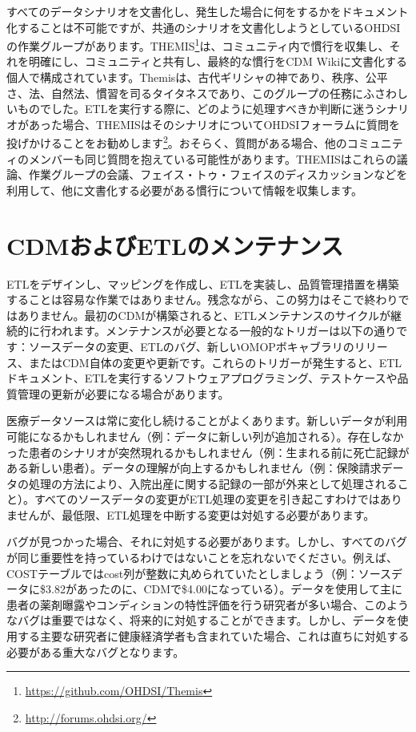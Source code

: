 \documentclass[
  11pt]{book}
\theoremstyle{definition}
\theoremstyle{definition}
\theoremstyle{definition}
\theoremstyle{definition}
\theoremstyle{remark}
\begin{document}
すべてのデータシナリオを文書化し、発生した場合に何をするかをドキュメント化することは不可能ですが、共通のシナリオを文書化しようとしているOHDSIの作業グループがあります。THEMIS\footnote{\url{https://github.com/OHDSI/Themis}}は、コミュニティ内で慣行を収集し、それを明確にし、コミュニティと共有し、最終的な慣行をCDM Wikiに文書化する個人で構成されています。Themisは、古代ギリシャの神であり、秩序、公平さ、法、自然法、慣習を司るタイタネスであり、このグループの任務にふさわしいものでした。ETLを実行する際に、どのように処理すべきか判断に迷うシナリオがあった場合、THEMISはそのシナリオについてOHDSIフォーラムに質問を投げかけることをお勧めします\footnote{\url{http://forums.ohdsi.org/}}。おそらく、質問がある場合、他のコミュニティのメンバーも同じ質問を抱えている可能性があります。THEMISはこれらの議論、作業グループの会議、フェイス・トゥ・フェイスのディスカッションなどを利用して、他に文書化する必要がある慣行について情報を収集します。

\section{CDMおよびETLのメンテナンス}\label{CDMandETLMaintenance}

ETLをデザインし、マッピングを作成し、ETLを実装し、品質管理措置を構築することは容易な作業ではありません。残念ながら、この努力はそこで終わりではありません。最初のCDMが構築されると、ETLメンテナンスのサイクルが継続的に行われます。メンテナンスが必要となる一般的なトリガーは以下の通りです：ソースデータの変更、ETLのバグ、新しいOMOPボキャブラリのリリース、またはCDM自体の変更や更新です。これらのトリガーが発生すると、ETLドキュメント、ETLを実行するソフトウェアプログラミング、テストケースや品質管理の更新が必要になる場合があります。

医療データソースは常に変化し続けることがよくあります。新しいデータが利用可能になるかもしれません（例：データに新しい列が追加される）。存在しなかった患者のシナリオが突然現れるかもしれません（例：生まれる前に死亡記録がある新しい患者）。データの理解が向上するかもしれません（例：保険請求データの処理の方法により、入院出産に関する記録の一部が外来として処理されること）。すべてのソースデータの変更がETL処理の変更を引き起こすわけではありませんが、最低限、ETL処理を中断する変更は対処する必要があります。

バグが見つかった場合、それに対処する必要があります。しかし、すべてのバグが同じ重要性を持っているわけではないことを忘れないでください。例えば、COSTテーブルではcost列が整数に丸められていたとしましょう（例：ソースデータに\$3.82があったのに、CDMで\$4.00になっている）。データを使用して主に患者の薬剤曝露やコンディションの特性評価を行う研究者が多い場合、このようなバグは重要ではなく、将来的に対処することができます。しかし、データを使用する主要な研究者に健康経済学者も含まれていた場合、これは直ちに対処する必要がある重大なバグとなります。
\end{document}
